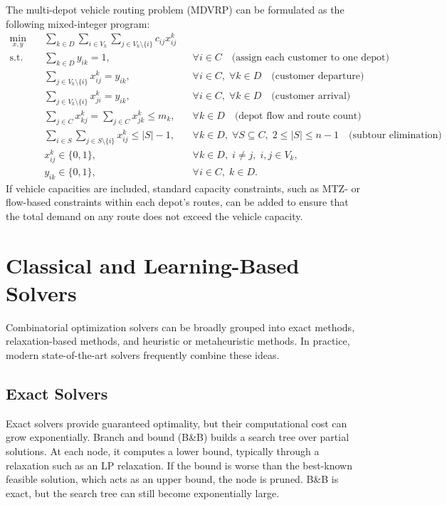 The multi-depot vehicle routing problem (MDVRP) can be formulated as the following
mixed-integer program:
\[
\begin{aligned}
\min_{x,y}\quad
& \sum_{k\in D}\sum_{i\in V_k}\sum_{j\in V_k\setminus\{i\}} c_{ij}x_{ij}^k\\
\text{s.t.}\quad
& \sum_{k\in D} y_{ik} = 1, && \forall i\in C
  \quad \text{(assign each customer to one depot)}\\
& \sum_{j\in V_k\setminus\{i\}} x_{ij}^k = y_{ik}, &&
  \forall i\in C,\; \forall k\in D
  \quad \text{(customer departure)}\\
& \sum_{j\in V_k\setminus\{i\}} x_{ji}^k = y_{ik}, &&
  \forall i\in C,\; \forall k\in D
  \quad \text{(customer arrival)}\\
& \sum_{j\in C} x_{kj}^k = \sum_{j\in C} x_{jk}^k \le m_k, && \forall k\in D
  \quad \text{(depot flow and route count)}\\
& \sum_{i\in S}\sum_{j\in S\setminus\{i\}} x_{ij}^k \le |S|-1, &&
  \forall k\in D,\; \forall S\subseteq C,\; 2\le |S|\le n-1
  \quad \text{(subtour elimination)}\\
& x_{ij}^k\in\{0,1\}, && \forall k\in D,\; i\ne j,\; i,j\in V_k,\\
& y_{ik}\in\{0,1\}, && \forall i\in C,\; k\in D.
\end{aligned}
\]
If vehicle capacities are included, standard capacity constraints, such as MTZ- or flow-based
constraints within each depot's routes, can be added to ensure that the total demand on any
route does not exceed the vehicle capacity.

\section{Classical and Learning-Based Solvers}
\label{sec:solvers}

Combinatorial optimization solvers can be broadly grouped into exact methods,
relaxation-based methods, and heuristic or metaheuristic methods. In practice, modern
state-of-the-art solvers frequently combine these ideas.

\subsection{Exact Solvers}
\label{subsec:exact-solvers}

Exact solvers provide guaranteed optimality, but their computational cost can grow
exponentially. Branch and bound (B\&B) builds a search tree over partial solutions. At each
node, it computes a lower bound, typically through a relaxation such as an LP relaxation. If
the bound is worse than the best-known feasible solution, which acts as an upper bound, the
node is pruned. B\&B is exact, but the search tree can still become exponentially large.


